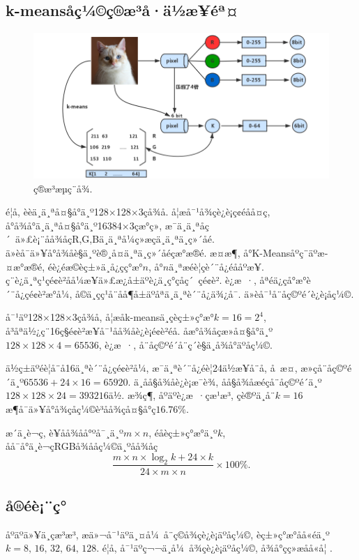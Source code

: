 \documentclass[lang=cn,11pt]{elegantpaper}
\begin{document}
\subsection{k-meansåç¼©ç®æ³å·ä½æ­¥éª¤}
\begin{figure}[ht]
    \centering
    \includegraphics[width=.8\textwidth]{Flow}
    \caption{ç®æ³æµç¨å¾. \label{fig:flow}}
\end{figure}
é¦å, èèä¸ä¸ªå¤§å°ä¸º128$\times$128$\times$3çå¾å. å¦æå¯¹å¾çè¿è¡ç¢éåå¤ç, å°å¾å°ä¸ä¸ªå¤§å°ä¸º16384$\times$3çæ°ç», æ¯ä¸ä¸ªåç´ ä»£è¡¨åå¾åçR,G,Bä¸ä¸ªå¼ç»æçä¸ä¸ªä¸ç»´åé. ä»èå¯ä»¥å°å¾åè§ä¸ºè®¸å¤ä¸ªä¸ç»´åéçæ°æ®é. æ­¤æ¶, å°K-Meansåºç¨äºæ­¤æ°æ®é, éè¿éæ©èç±»ä¸­å¿çç°æ°$n$, å°$n$ä¸ªæéè¦çè´¨å¿éååºæ¥. ç¨è¿ä¸ªç¹çé¢è²åå¼æ¥ä»£æ¿å±äºè¿ä¸ç°çåç´ çé¢è². è¿æ ·, åªéä¿çå°æ°è´¨å¿çé¢è²æ°å¼, å©ä¸çç¹å¨å­å¶å±äºåªä¸ä¸ªè´¨å¿ä¾¿å¯. ä»èå¯¹å¨å­ç©ºé´è¿è¡åç¼©. 

å¯¹äº128$\times$128$\times$3çå¾å, å¦æåk-meansä¸­çèç±»ç°æ°$k=16=2^4$, å³åªä½¿ç¨16ç§é¢è²æ¥å¯¹åå¾åè¿è¡é¢è²éå. åæ°å¾åçæ»å¤§å°ä¸º$128\times128\times4 = 65536$, è¿æ ·, å¨å­ç©ºé´å¨ç´è§ä¸å¾å°äºåç¼©. 

ä½ç±äºéè¦å¨å­16ä¸ªè´¨å¿çé¢è²å¼, æ¯ä¸ªè´¨å¿éè¦24ä½æ¥å¨å­, å æ­¤, æ»çå¨å­ç©ºé´ä¸º$65536 + 24 \times 16 = 65920$. ä¸åå§å¾åè¿è¡æ¯è¾, åå§å¾åæéçå¨å­ç©ºé´ä¸º$128 \times 128 \times 24 = 393216$ä½. æ¾ç¶, åºäºè¿æ ·çæ¹æ³, çè®ºä¸å¨$k=16$æ¶å¯ä»¥å°å¾çåç¼©è³åå¾çå¤§å°ç$16.76\%$. 

æ´ä¸è¬ç, è¥åå¾åå°ºå¯¸ä¸º$m\times n$, éåèç±»ç°æ°ä¸º$k$, åå¯å°ä¸è¬çRGBå¾ååç¼©ä¸ºåå¾åç$$\frac{m\times n \times \log_2k+24\times k}{24\times m\times n}\times 100\%.$$
\subsection{å®éè¡¨ç°}
åºäºä»¥ä¸çæ³æ³, æä»¬å¯¹äºä¸¤å¼ å¨ç©å¾çè¿è¡äºåç¼©, èç±»ç°æ°åå«éä¸º$k=8,\,16,\,32,\,64,\,128$. é¦å, å¯¹äºç¬¬ä¸å¼ å¾çè¿è¡äºåç¼©, å¾å°çç»æåå«å¦ .
\end{document}
